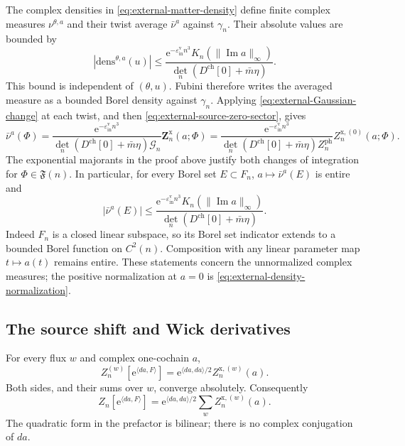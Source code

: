 \documentclass[11pt,letterpaper,reqno]{amsart}
\begin{document}
The complex densities in
\eqref{eq:external-matter-density} define finite complex
measures $\nu^{\theta,a}$ and their twist average
$\bar\nu^a$ against $\gamma_n$. Their absolute values
are bounded by
\begin{equation}\label{eq:external-complex-density-bound}
 |\mathrm{dens}^{\theta,a}(u)|
 \le
 \frac{\mathrm e^{-\varepsilon_{\mathrm{in}}^{\mathrm v}n^3}
                   K_n(\|\operatorname{Im}a\|_\infty)}
                   {\det_n(D^{\mathrm{ch}}[0]+\bar m\eta)}.
\end{equation}
This bound is independent of $(\theta,u)$.
Fubini therefore writes the averaged measure as a
bounded Borel density against $\gamma_n$. Applying
\eqref{eq:external-Gaussian-change} at each twist,
and then \eqref{eq:external-source-zero-sector}, gives
\begin{equation}\label{eq:external-complex-measure}
 \bar\nu^a(\Phi)=
 \frac{\mathrm e^{-\varepsilon_{\mathrm{in}}^{\mathrm v}n^3}}
      {\det_n(D^{\mathrm{ch}}[0]+\bar m\eta)\mathcal G_n}
                     \mathbf Z_n^{\mathrm{x}}(a;\Phi)
 =
 \frac{\mathrm e^{-\varepsilon_{\mathrm{in}}^{\mathrm v}n^3}}
      {\det_n(D^{\mathrm{ch}}[0]+\bar m\eta)Z_n^{\mathrm{ph}}}
                     Z_n^{\mathrm{x},(0)}(a;\Phi).
\end{equation}
The exponential majorants in the proof above justify
both changes of integration for $\Phi\in\mathfrak F(n)$.
In particular, for every Borel set $E\subset F_n$,
$a\mapsto\bar\nu^a(E)$ is entire and
\[
 |\bar\nu^a(E)|\le
 \frac{\mathrm e^{-\varepsilon_{\mathrm{in}}^{\mathrm v}n^3}
                   K_n(\|\operatorname{Im}a\|_\infty)}
                   {\det_n(D^{\mathrm{ch}}[0]+\bar m\eta)}.
\]
Indeed $F_n$ is a closed linear subspace, so its
Borel set indicator extends to a bounded Borel
function on $C^2(n)$. Composition with any linear
parameter map $t\mapsto a(t)$ remains entire.
These statements concern the unnormalized complex
measures; the positive normalization at $a=0$ is
\eqref{eq:external-density-normalization}.

\subsection{The source shift and Wick derivatives}
\label{subsec:external-source-shift}

\begin{proposition}\label{prop:external-shift}
For every flux $w$ and complex one-cochain $a$,
\begin{equation}\label{eq:external-shift-sector}
 Z_n^{(w)}[\mathrm e^{\langle da,F\rangle}]
      =\mathrm e^{\langle da,da\rangle/2}Z_n^{\mathrm{x},(w)}(a).
\end{equation}
Both sides, and their sums over $w$, converge
absolutely. Consequently
\begin{equation}\label{eq:external-shift-all-flux}
 Z_n[\mathrm e^{\langle da,F\rangle}]
      =\mathrm e^{\langle da,da\rangle/2}
                    \sum_w Z_n^{\mathrm{x},(w)}(a).
\end{equation}
The quadratic form in the prefactor is bilinear;
there is no complex conjugation of $da$.
\end{proposition}
\end{document}
